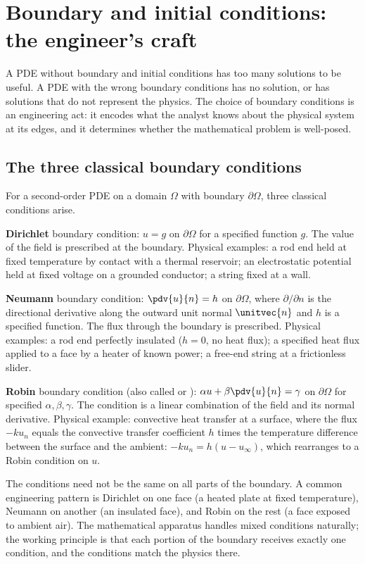 \section{Boundary and initial conditions: the engineer's craft}

A PDE without boundary and initial conditions has too many
solutions to be useful. A PDE with the wrong boundary conditions
has no solution, or has solutions that do not represent the
physics. The choice of boundary conditions is an engineering act:
it encodes what the analyst knows about the physical system at
its edges, and it determines whether the mathematical problem is
well-posed.

\subsection{The three classical boundary conditions}

For a second-order PDE on a domain $\Omega$ with boundary
$\partial \Omega$, three classical conditions arise.

\textbf{Dirichlet} boundary condition: $u = g$ on $\partial
\Omega$ for a specified function $g$. The value of the field is
prescribed at the boundary. Physical examples: a rod end held at
fixed temperature by contact with a thermal reservoir; an
electrostatic potential held at fixed voltage on a grounded
conductor; a string fixed at a wall.

\textbf{Neumann} boundary condition: $\pdv{u}{n} = h$ on $\partial
\Omega$, where $\partial/\partial n$ is the directional derivative
along the outward unit normal $\unitvec{n}$ and $h$ is a specified
function. The flux through the boundary is prescribed. Physical
examples: a rod end perfectly insulated ($h = 0$, no heat flux); a
specified heat flux applied to a face by a heater of known power;
a free-end string at a frictionless slider.

\textbf{Robin} boundary condition (also called  or
): $\alpha u + \beta \pdv{u}{n} = \gamma$ on
$\partial \Omega$ for specified $\alpha, \beta, \gamma$. The
condition is a linear combination of the field and its normal
derivative. Physical example: convective heat transfer at a
surface, where the flux $-k u_{n}$ equals the convective transfer
coefficient $h$ times the temperature difference between the
surface and the ambient: $-k u_{n} = h (u - u_{\infty})$, which
rearranges to a Robin condition on $u$.

The conditions need not be the same on all parts of the boundary.
A common engineering pattern is Dirichlet on one face (a heated
plate at fixed temperature), Neumann on another (an insulated
face), and Robin on the rest (a face exposed to ambient air). The
mathematical apparatus handles mixed conditions naturally; the
working principle is that each portion of the boundary receives
exactly one condition, and the conditions match the physics there.

